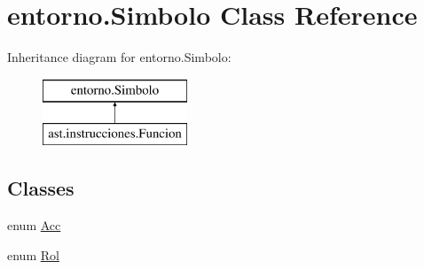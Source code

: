 \hypertarget{classentorno_1_1_simbolo}{}\section{entorno.\+Simbolo Class Reference}
\label{classentorno_1_1_simbolo}
Inheritance diagram for entorno.\+Simbolo\+:\begin{figure}[H]
\begin{center}
\leavevmode
\includegraphics[height=2.000000cm]{classentorno_1_1_simbolo}
\end{center}
\end{figure}
\subsection*{Classes}
\begin{DoxyCompactItemize}
\item 
enum \mbox{\hyperlink{enumentorno_1_1_simbolo_1_1_acc}{Acc}}
\item 
enum \mbox{\hyperlink{enumentorno_1_1_simbolo_1_1_rol}{Rol}}
\end{DoxyCompactItemize}
